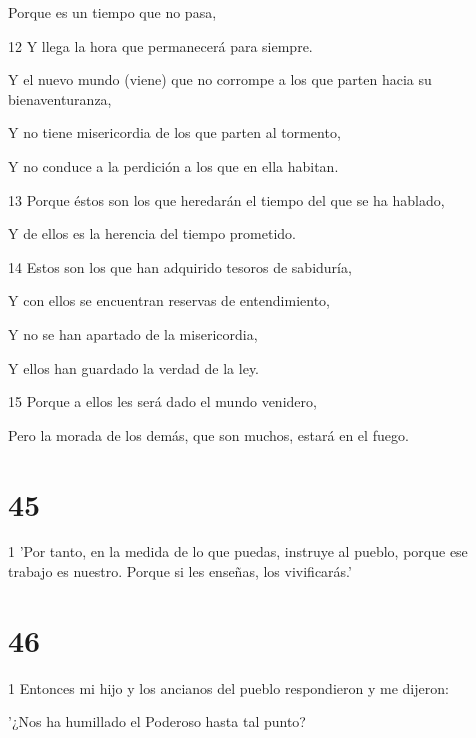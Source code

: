 \par Porque es un tiempo que no pasa,

\par 12 Y llega la hora que permanecerá para siempre.

\par Y el nuevo mundo (viene) que no corrompe a los que parten hacia su bienaventuranza,

\par Y no tiene misericordia de los que parten al tormento,

\par Y no conduce a la perdición a los que en ella habitan.

\par 13 Porque éstos son los que heredarán el tiempo del que se ha hablado,

\par Y de ellos es la herencia del tiempo prometido.

\par 14 Estos son los que han adquirido tesoros de sabiduría,

\par Y con ellos se encuentran reservas de entendimiento,

\par Y no se han apartado de la misericordia,

Y ellos han guardado la verdad de la ley.

\par 15 Porque a ellos les será dado el mundo venidero,

Pero la morada de los demás, que son muchos, estará en el fuego.

\chapter{45}

\par 1 'Por tanto, en la medida de lo que puedas, instruye al pueblo, porque ese trabajo es nuestro. Porque si les enseñas, los vivificarás.'

\chapter{46}

\par 1 Entonces mi hijo y los ancianos del pueblo respondieron y me dijeron:

\par '¿Nos ha humillado el Poderoso hasta tal punto?

